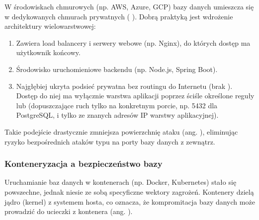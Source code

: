 \documentclass[a4paper,11pt,english,openany,oneside]{sphinxmanual}
\begin{document}
\sphinxAtStartPar
W środowiskach chmurowych (np. AWS, Azure, GCP) bazy danych umieszcza się w dedykowanych chmurach prywatnych ( \sphinxhyphen{} ). Dobrą praktyką jest wdrożenie architektury wielowarstwowej:
\begin{enumerate}
%
\item {} 
\sphinxAtStartPar
{} Zawiera load balancery i serwery webowe (np. Nginx), do których dostęp ma użytkownik końcowy.

\item {} 
\sphinxAtStartPar
{} Środowisko uruchomieniowe backendu (np. Node.js, Spring Boot).

\item {} 
\sphinxAtStartPar
{} Najgłębiej ukryta podsieć prywatna bez routingu do Internetu (brak ). Dostęp do niej ma wyłącznie warstwa aplikacji poprzez ściśle określone reguły  lub  (dopuszczające ruch tylko na konkretnym porcie, np. 5432 dla PostgreSQL, i tylko ze znanych adresów IP warstwy aplikacyjnej).

\end{enumerate}

\sphinxAtStartPar
Takie podejście drastycznie zmniejsza powierzchnię ataku (ang. ), eliminując ryzyko bezpośrednich ataków typu  na porty bazy danych z zewnątrz.


\subsubsection{Konteneryzacja a bezpieczeństwo bazy}
\label{\detokenize{rozdzial_2/rozdzial_27/rozdzial_1:konteneryzacja-a-bezpieczenstwo-bazy}}
\sphinxAtStartPar
Uruchamianie baz danych w kontenerach (np. Docker, Kubernetes) stało się powszechne, jednak niesie ze sobą specyficzne wektory zagrożeń. Kontenery dzielą jądro (kernel) z systemem hosta, co oznacza, że kompromitacja bazy danych może prowadzić do ucieczki z kontenera (ang. ).
\end{document}
